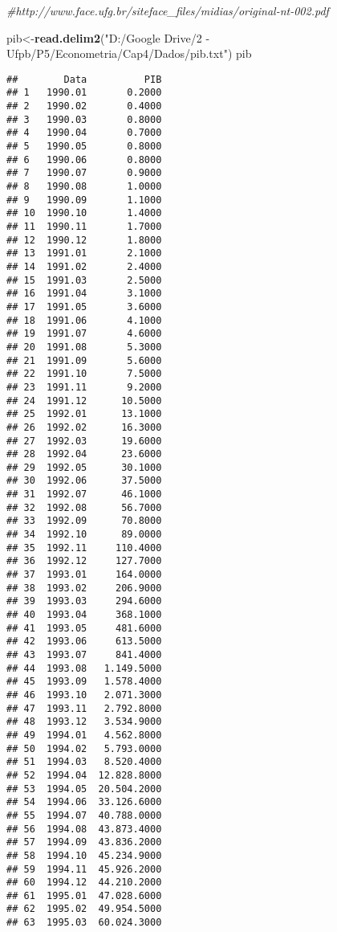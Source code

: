 \documentclass[]{article}
\title{}
\author{}
\date{}
\newenvironment{Shaded}{\begin{snugshade}}{\end{snugshade}}
\newcommand{\CommentTok}[1]{\textcolor[rgb]{0.56,0.35,0.01}{\textit{#1}}}
\newcommand{\KeywordTok}[1]{\textcolor[rgb]{0.13,0.29,0.53}{\textbf{#1}}}
\newcommand{\NormalTok}[1]{#1}
\newcommand{\StringTok}[1]{\textcolor[rgb]{0.31,0.60,0.02}{#1}}
\begin{document}
\begin{Shaded}
\begin{Highlighting}[]
\CommentTok{#http://www.face.ufg.br/siteface_files/midias/original-nt-002.pdf}
\end{Highlighting}
\end{Shaded}

\begin{Shaded}
\begin{Highlighting}[]
\NormalTok{pib<-}\KeywordTok{read.delim2}\NormalTok{(}\StringTok{"D:/Google Drive/2 - Ufpb/P5/Econometria/Cap4/Dados/pib.txt"}\NormalTok{)}
\NormalTok{pib}
\end{Highlighting}
\end{Shaded}

\begin{verbatim}
##        Data          PIB
## 1   1990.01       0.2000
## 2   1990.02       0.4000
## 3   1990.03       0.8000
## 4   1990.04       0.7000
## 5   1990.05       0.8000
## 6   1990.06       0.8000
## 7   1990.07       0.9000
## 8   1990.08       1.0000
## 9   1990.09       1.1000
## 10  1990.10       1.4000
## 11  1990.11       1.7000
## 12  1990.12       1.8000
## 13  1991.01       2.1000
## 14  1991.02       2.4000
## 15  1991.03       2.5000
## 16  1991.04       3.1000
## 17  1991.05       3.6000
## 18  1991.06       4.1000
## 19  1991.07       4.6000
## 20  1991.08       5.3000
## 21  1991.09       5.6000
## 22  1991.10       7.5000
## 23  1991.11       9.2000
## 24  1991.12      10.5000
## 25  1992.01      13.1000
## 26  1992.02      16.3000
## 27  1992.03      19.6000
## 28  1992.04      23.6000
## 29  1992.05      30.1000
## 30  1992.06      37.5000
## 31  1992.07      46.1000
## 32  1992.08      56.7000
## 33  1992.09      70.8000
## 34  1992.10      89.0000
## 35  1992.11     110.4000
## 36  1992.12     127.7000
## 37  1993.01     164.0000
## 38  1993.02     206.9000
## 39  1993.03     294.6000
## 40  1993.04     368.1000
## 41  1993.05     481.6000
## 42  1993.06     613.5000
## 43  1993.07     841.4000
## 44  1993.08   1.149.5000
## 45  1993.09   1.578.4000
## 46  1993.10   2.071.3000
## 47  1993.11   2.792.8000
## 48  1993.12   3.534.9000
## 49  1994.01   4.562.8000
## 50  1994.02   5.793.0000
## 51  1994.03   8.520.4000
## 52  1994.04  12.828.8000
## 53  1994.05  20.504.2000
## 54  1994.06  33.126.6000
## 55  1994.07  40.788.0000
## 56  1994.08  43.873.4000
## 57  1994.09  43.836.2000
## 58  1994.10  45.234.9000
## 59  1994.11  45.926.2000
## 60  1994.12  44.210.2000
## 61  1995.01  47.028.6000
## 62  1995.02  49.954.5000
## 63  1995.03  60.024.3000

\end{verbatim}
\end{document}
